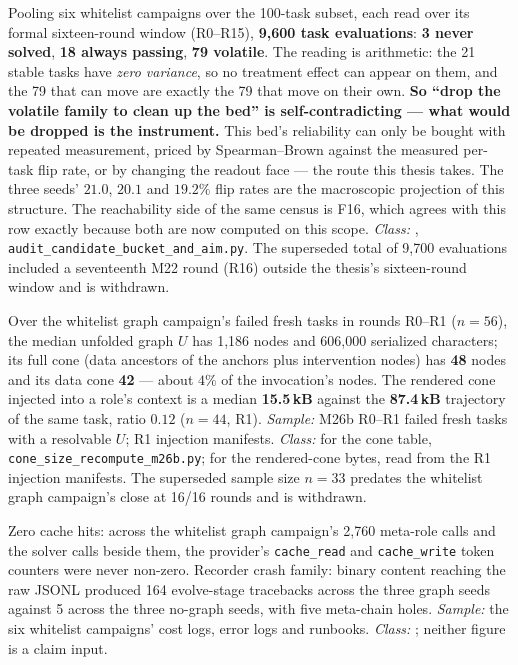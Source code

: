 \begin{description}[leftmargin=0pt,labelindent=0pt,labelsep=0pt,style=nextline,font=\normalfont,itemsep=6pt]
\item[\textbf{F54}\quad Task-class census --- this bed has no subset that
      is both informative and reliable.]
Pooling six whitelist campaigns over the 100-task subset, each read over
its formal sixteen-round window (R0--R15),
\textbf{9{,}600 task evaluations}: \textbf{3 never solved}, \textbf{18
always passing}, \textbf{79 volatile}. The reading is arithmetic: the 21
stable tasks have \emph{zero variance}, so no treatment effect can appear
on them, and the 79 that can move are exactly the 79 that move on their
own. \textbf{So ``drop the volatile family to clean up the bed'' is
self-contradicting --- what would be dropped is the instrument.} This bed's
reliability can only be bought with repeated measurement, priced by
Spearman--Brown against the measured per-task flip rate, or by changing the
readout face --- the route this thesis takes. The three seeds' $21.0$,
$20.1$ and $19.2\%$ flip rates are the macroscopic projection of this
structure. The reachability side of the same census is F16, which agrees
with this row exactly because both are now computed on this scope. \emph{Class:} ,
\texttt{audit\_candidate\_bucket\_and\_aim.py}. The superseded total
of 9{,}700 evaluations included a seventeenth M22 round (R16) outside
the thesis's sixteen-round window and is withdrawn.

\item[\textbf{F55}\quad Cone size, and the rendered cone against the
      trajectory it competes with.]
Over the whitelist graph campaign's failed fresh tasks in rounds R0--R1
($n{=}56$), the median unfolded graph $U$ has 1{,}186 nodes and
606{,}000 serialized characters; its full cone (data ancestors of the
anchors plus intervention nodes) has \textbf{48} nodes and its data
cone \textbf{42} --- about $4\%$ of the invocation's nodes. The rendered
cone injected into a role's context is a median \textbf{15.5\,kB}
against the \textbf{87.4\,kB} trajectory of the same task, ratio
$0.12$ ($n{=}44$, R1). \emph{Sample:} M26b R0--R1 failed fresh tasks
with a resolvable $U$; R1 injection manifests. \emph{Class:} 
for the cone table, \texttt{cone\_size\_recompute\_m26b.py}; 
for the rendered-cone bytes, read from the R1 injection manifests. The
superseded sample size $n{=}33$ predates the whitelist graph campaign's
close at 16/16 rounds and is withdrawn.

\item[\textbf{F56}\quad Operations record: cache counters and the
      recorder's crash family.] 
Zero cache hits: across the whitelist graph campaign's 2{,}760 meta-role
calls and the solver calls beside them, the provider's
\texttt{cache\_read} and \texttt{cache\_write} token counters were never
non-zero. Recorder crash family: binary content reaching the raw JSONL
produced 164 evolve-stage tracebacks across the three graph seeds
against 5 across the three no-graph seeds, with five meta-chain holes.
\emph{Sample:} the six whitelist campaigns' cost logs, error logs and
runbooks. \emph{Class:} ; neither figure is a claim input.


\end{description}
